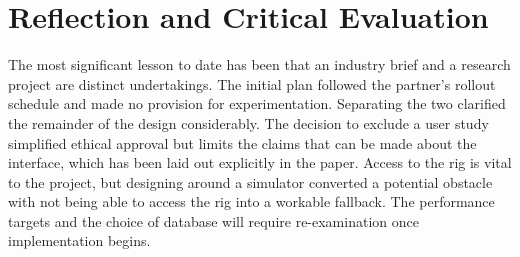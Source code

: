 \section{Reflection and Critical Evaluation}
\label{sec:reflection}

The most significant lesson to date has been that an industry brief and a research project are distinct undertakings.
The initial plan followed the partner's rollout schedule and made no provision for experimentation.
Separating the two clarified the remainder of the design considerably.
The decision to exclude a user study simplified ethical approval but limits the claims that can be made about the interface, which has been laid out explicitly in the paper.
Access to the rig is vital to the project, but designing around a simulator converted a potential obstacle with not being able to access the rig into a workable fallback.
The performance targets and the choice of database will require re-examination once implementation begins.

